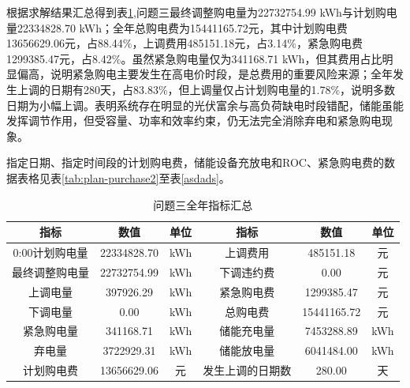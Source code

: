\documentclass{cumcm2026}
\begin{document}
根据求解结果汇总得到表\ref{tab:q3-year-summary},问题三最终调整购电量为22732754.99 kWh与计划购电量22334828.70 kWh；全年总购电费为15441165.72元，其中计划购电费13656629.06元，占88.44\%，上调费用485151.18元，占3.14\%，紧急购电费1299385.47元，占8.42\%。虽然紧急购电量仅为341168.71 kWh，但其费用占比明显偏高，说明紧急购电主要发生在高电价时段，是总费用的重要风险来源；全年发生上调的日期有280天，占83.83\%，但上调量仅占计划购电量的1.78\%，说明多数日期为小幅上调。表明系统存在明显的光伏富余与高负荷缺电时段错配，储能虽能发挥调节作用，但受容量、功率和效率约束，仍无法完全消除弃电和紧急购电现象。

指定日期、指定时间段的计划购电费，储能设备充放电和ROC、紧急购电费的数据表格见表\ref{tab:plan-purchase2}至表\ref{asdads}。
\begin{table}[H]
\centering
\caption{问题三全年指标汇总}
\label{tab:q3-year-summary}

\begin{tabular}{@{}cccccc@{}}
\toprule
\textbf{指标} & \textbf{数值} & \textbf{单位} &
\textbf{指标} & \textbf{数值} & \textbf{单位} \\
\midrule
0:00计划购电量 & 22334828.70 & kWh &
上调费用 & 485151.18 & 元 \\
最终调整购电量 & 22732754.99 & kWh &
下调违约费 & 0.00 & 元 \\
上调电量 & 397926.29 & kWh &
紧急购电费 & 1299385.47 & 元 \\
下调电量 & 0.00 & kWh &
总购电费 & 15441165.72 & 元 \\
紧急购电量 & 341168.71 & kWh &
储能充电量 & 7453288.89 & kWh \\
弃电量 & 3722929.31 & kWh &
储能放电量 & 6041484.00 & kWh \\
计划购电费 & 13656629.06 & 元 &
发生上调的日期数 & 280.00 & 天 \\
\bottomrule
\end{tabular}
\end{table}
\end{document}
